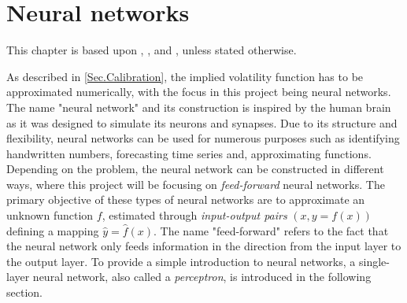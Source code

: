 \chapter{Neural networks}\label{Ch.3}
This chapter is based upon \citep[Ch. 10]{SL-ISLR}, \citep[Ch. 1]{NN}, and \citep[Ch. 2]{NNDL}, unless stated otherwise.

As described in \autoref{Sec.Calibration}, the implied volatility function has to be approximated numerically, with the focus in this project being neural networks. The name "neural network" and its construction is inspired by the human brain as it was designed to simulate its neurons and synapses. Due to its structure and flexibility, neural networks can be used for numerous purposes such as identifying handwritten numbers, forecasting time series and, approximating functions. Depending on the problem, the neural network can be constructed in different ways, where this project will be focusing on \emph{feed-forward} neural networks. The primary objective of these types of neural networks are to approximate an unknown function $f$, estimated through \emph{input-output pairs} $(x, y = f(x))$ defining a mapping $\hat{y} = \hat{f}(x)$. The name "feed-forward" refers to the fact that the neural network only feeds information in the direction from the input layer to the output layer. To provide a simple introduction to neural networks, a single-layer neural network, also called a \emph{perceptron}, is introduced in the following section. 


